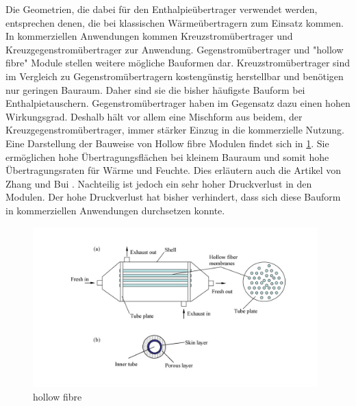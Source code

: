Die Geometrien, die dabei für den Enthalpieübertrager verwendet werden, entsprechen denen, die bei klassischen Wärmeübertragern zum Einsatz kommen. In kommerziellen Anwendungen kommen Kreuzstromübertrager und Kreuzgegenstromübertrager zur Anwendung. Gegenstromübertrager und "hollow fibre" Module stellen weitere mögliche Bauformen dar. Kreuzstromübertrager sind im Vergleich zu Gegenstromübertragern kostengünstig herstellbar und benötigen nur geringen Bauraum. Daher sind sie die bisher häufigste Bauform bei Enthalpietauschern. Gegenstromübertrager haben im Gegensatz dazu einen hohen Wirkungsgrad. Deshalb hält vor allem eine Mischform aus beidem, der Kreuzgegenstromübertrager, immer stärker Einzug in die kommerzielle Nutzung. Eine Darstellung der Bauweise von Hollow fibre Modulen findet sich in \ref{fig:hollow fibre Modul}. Sie ermöglichen hohe Übertragungsflächen bei kleinem Bauraum und somit hohe Übertragungsraten für Wärme und Feuchte. Dies erläutern auch die Artikel von Zhang und Bui \cite{Zhang.2010} \cite{Bui.2010}. Nachteilig ist jedoch ein sehr hoher Druckverlust in den Modulen. Der hohe Druckverlust hat bisher verhindert, dass sich diese Bauform in kommerziellen Anwendungen durchsetzen konnte. 

\begin{figure} [h]
	\centering
	\includegraphics[width=0.98\textwidth]{pictures/hollow_fibre.jpg}
	\caption{hollow fibre}
	\label{fig:hollow fibre Modul}
\end{figure}


